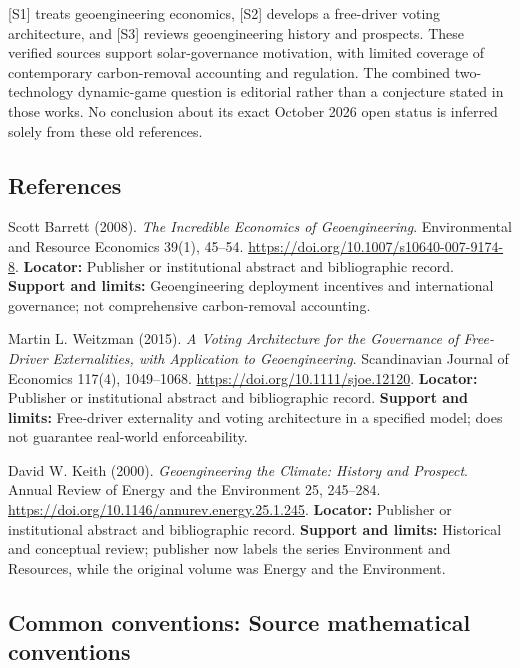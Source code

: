 \documentclass[11pt,a4paper]{article}
\begin{document}
[S1] treats geoengineering economics, [S2] develops a free-driver voting architecture, and [S3] reviews geoengineering history and prospects. These verified sources support solar-governance motivation, with limited coverage of contemporary carbon-removal accounting and regulation. The combined two-technology dynamic-game question is editorial rather than a conjecture stated in those works. No conclusion about its exact October 2026 open status is inferred solely from these old references.

\subsection*{References}

\begin{enumerate}[label={[\textnormal{S}\arabic*]},leftmargin=*]

\item Scott Barrett (2008). \emph{The Incredible Economics of Geoengineering}. Environmental and Resource Economics 39(1), 45–54. \url{https://doi.org/10.1007/s10640-007-9174-8}. \textbf{Locator:} Publisher or institutional abstract and bibliographic record. \textbf{Support and limits:} Geoengineering deployment incentives and international governance; not comprehensive carbon-removal accounting.

\item Martin L. Weitzman (2015). \emph{A Voting Architecture for the Governance of Free-Driver Externalities, with Application to Geoengineering}. Scandinavian Journal of Economics 117(4), 1049–1068. \url{https://doi.org/10.1111/sjoe.12120}. \textbf{Locator:} Publisher or institutional abstract and bibliographic record. \textbf{Support and limits:} Free-driver externality and voting architecture in a specified model; does not guarantee real-world enforceability.

\item David W. Keith (2000). \emph{Geoengineering the Climate: History and Prospect}. Annual Review of Energy and the Environment 25, 245–284. \url{https://doi.org/10.1146/annurev.energy.25.1.245}. \textbf{Locator:} Publisher or institutional abstract and bibliographic record. \textbf{Support and limits:} Historical and conceptual review; publisher now labels the series Environment and Resources, while the original volume was Energy and the Environment.

\end{enumerate}

\subsection*{Common conventions: Source mathematical conventions}
\end{document}
